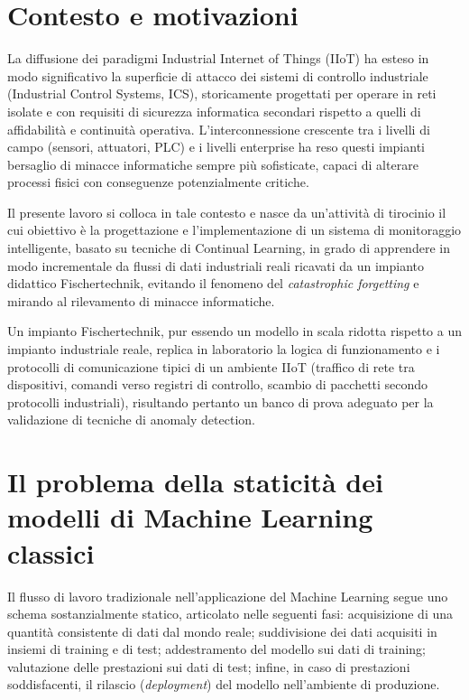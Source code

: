 \documentclass[12pt,a4paper]{report}
\begin{document}
\section{Contesto e motivazioni}

La diffusione dei paradigmi Industrial Internet of Things (IIoT) ha esteso in modo significativo la superficie di attacco dei sistemi di controllo industriale (Industrial Control Systems, ICS), storicamente progettati per operare in reti isolate e con requisiti di sicurezza informatica secondari rispetto a quelli di affidabilità e continuità operativa. L'interconnessione crescente tra i livelli di campo (sensori, attuatori, PLC) e i livelli enterprise ha reso questi impianti bersaglio di minacce informatiche sempre più sofisticate, capaci di alterare processi fisici con conseguenze potenzialmente critiche.

Il presente lavoro si colloca in tale contesto e nasce da un'attività di tirocinio il cui obiettivo è la progettazione e l'implementazione di un sistema di monitoraggio intelligente, basato su tecniche di Continual Learning, in grado di apprendere in modo incrementale da flussi di dati industriali reali ricavati da un impianto didattico Fischertechnik, evitando il fenomeno del \emph{catastrophic forgetting} e mirando al rilevamento di minacce informatiche.

Un impianto Fischertechnik, pur essendo un modello in scala ridotta rispetto a un impianto industriale reale, replica in laboratorio la logica di funzionamento e i protocolli di comunicazione tipici di un ambiente IIoT (traffico di rete tra dispositivi, comandi verso registri di controllo, scambio di pacchetti secondo protocolli industriali), risultando pertanto un banco di prova adeguato per la validazione di tecniche di anomaly detection.

\section{Il problema della staticità dei modelli di Machine Learning classici}

Il flusso di lavoro tradizionale nell'applicazione del Machine Learning segue uno schema sostanzialmente statico, articolato nelle seguenti fasi: acquisizione di una quantità consistente di dati dal mondo reale; suddivisione dei dati acquisiti in insiemi di training e di test; addestramento del modello sui dati di training; valutazione delle prestazioni sui dati di test; infine, in caso di prestazioni soddisfacenti, il rilascio (\emph{deployment}) del modello nell'ambiente di produzione.
\end{document}
